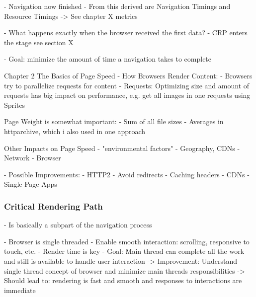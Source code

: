 
- Navigation now finished
- From this derived are Navigation Timings and Resource Timings -> See chapter X metrics 

- What happens exactly when the browser received the first data?
- CRP enters the stage see section X



- Goal: minimize the amount of time a navigation takes to complete

Chapter 2 The Basics of Page Speed - How Browsers Render Content:
- Browsers try to parallelize requests for content
- Requests: Optimizing size and amount of requests has big impact on performance, e.g. get all images in one requests using Sprites

Page Weight is somewhat important:
- Sum of all file sizes
- Averages in httparchive, which i also used in one approach %

Other Impacts on Page Speed
- "environmental factors"
- Geography, CDNs
- Network
- Browser


- Possible Improvements:
- HTTP2
- Avoid redirects
- Caching headers
- CDNs
- Single Page Apps








\subsubsection{Critical Rendering Path}

- Is basically a subpart of the navigation process








- Browser is single threaded
- Enable smooth interaction: scrolling, responsive to touch, etc.
- Render time is key
- Goal: Main thread can complete all the work and still is available to handle user interaction
-> Improvement: Understand single thread concept of browser and minimize main threads responsibilities
-> Should lead to: rendering is fast and smooth and responses to interactions are immediate

